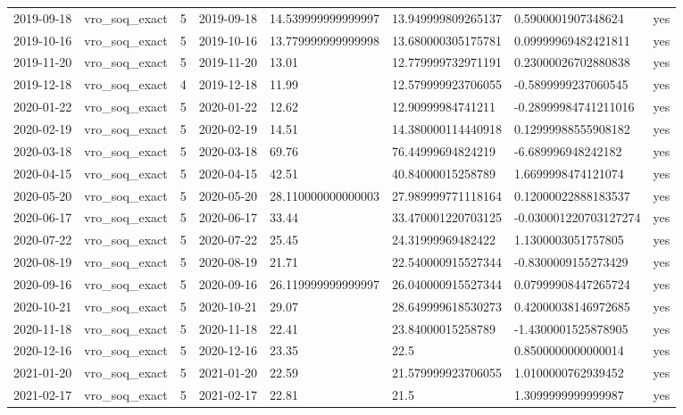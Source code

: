 \begin{tabular}{llllllll}
2019-09-18 & vro\_soq\_exact & 5 & 2019-09-18 & 14.539999999999997 & 13.949999809265137 & 0.5900001907348624 & yes \\
2019-10-16 & vro\_soq\_exact & 5 & 2019-10-16 & 13.779999999999998 & 13.680000305175781 & 0.09999969482421811 & yes \\
2019-11-20 & vro\_soq\_exact & 5 & 2019-11-20 & 13.01 & 12.779999732971191 & 0.23000026702880838 & yes \\
2019-12-18 & vro\_soq\_exact & 4 & 2019-12-18 & 11.99 & 12.579999923706055 & -0.5899999237060545 & yes \\
2020-01-22 & vro\_soq\_exact & 5 & 2020-01-22 & 12.62 & 12.90999984741211 & -0.28999984741211016 & yes \\
2020-02-19 & vro\_soq\_exact & 5 & 2020-02-19 & 14.51 & 14.380000114440918 & 0.12999988555908182 & yes \\
2020-03-18 & vro\_soq\_exact & 5 & 2020-03-18 & 69.76 & 76.44999694824219 & -6.689996948242182 & yes \\
2020-04-15 & vro\_soq\_exact & 5 & 2020-04-15 & 42.51 & 40.84000015258789 & 1.6699998474121074 & yes \\
2020-05-20 & vro\_soq\_exact & 5 & 2020-05-20 & 28.110000000000003 & 27.989999771118164 & 0.12000022888183537 & yes \\
2020-06-17 & vro\_soq\_exact & 5 & 2020-06-17 & 33.44 & 33.470001220703125 & -0.030001220703127274 & yes \\
2020-07-22 & vro\_soq\_exact & 5 & 2020-07-22 & 25.45 & 24.31999969482422 & 1.1300003051757805 & yes \\
2020-08-19 & vro\_soq\_exact & 5 & 2020-08-19 & 21.71 & 22.540000915527344 & -0.8300009155273429 & yes \\
2020-09-16 & vro\_soq\_exact & 5 & 2020-09-16 & 26.119999999999997 & 26.040000915527344 & 0.07999908447265724 & yes \\
2020-10-21 & vro\_soq\_exact & 5 & 2020-10-21 & 29.07 & 28.649999618530273 & 0.42000038146972685 & yes \\
2020-11-18 & vro\_soq\_exact & 5 & 2020-11-18 & 22.41 & 23.84000015258789 & -1.4300001525878905 & yes \\
2020-12-16 & vro\_soq\_exact & 5 & 2020-12-16 & 23.35 & 22.5 & 0.8500000000000014 & yes \\
2021-01-20 & vro\_soq\_exact & 5 & 2021-01-20 & 22.59 & 21.579999923706055 & 1.0100000762939452 & yes \\
2021-02-17 & vro\_soq\_exact & 5 & 2021-02-17 & 22.81 & 21.5 & 1.3099999999999987 & yes \\

\end{tabular}
